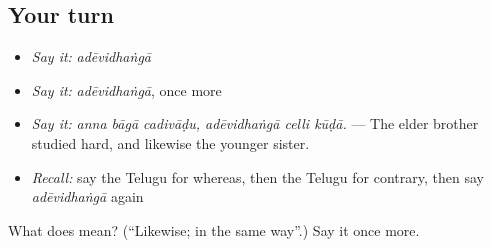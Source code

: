 \subsection*{Your turn}
\begin{itemize}
\raggedright
  \item \emph{Say it:} \emph{adēvidhaṅgā}
  \item \emph{Say it:} \emph{adēvidhaṅgā}, once more
  \item \emph{Say it:} \emph{anna bāgā cadivāḍu, adēvidhaṅgā celli kūḍā.} — The elder brother studied hard, and likewise the younger sister.
  \item \emph{Recall:} say the Telugu for whereas, then the Telugu for contrary, then say \emph{adēvidhaṅgā} again
\end{itemize}

\begin{tcolorbox}[breakable,colback=teal!4,colframe=teal!35!black,title={Before you move on}]
What does  mean? (\textquotedblleft{}Likewise; in the same way\textquotedblright{}.) Say it once more.
\end{tcolorbox}
